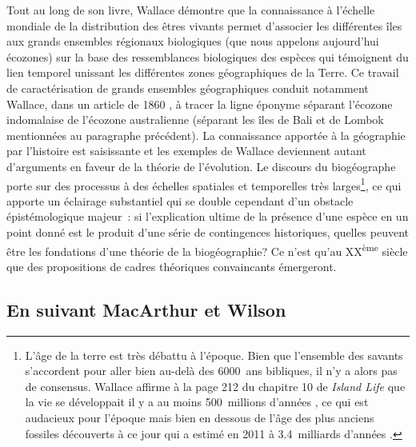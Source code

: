 Tout au long de son livre, Wallace démontre que la connaissance à
l'échelle mondiale de la distribution des êtres vivants permet
d'associer les différentes îles aux grands ensembles régionaux
biologiques (que nous appelons aujourd'hui écozones) sur la base des
ressemblances biologiques des espèces qui témoignent du lien temporel
unissant les différentes zones géographiques de la Terre. Ce travail de
caractérisation de grands ensembles géographiques conduit notamment
Wallace, dans un article de 1860 \citep{Wallace1860}, à tracer la ligne
éponyme séparant l'écozone indomalaise de l'écozone australienne
(séparant les îles de Bali et de Lombok mentionnées au paragraphe
précédent). La connaissance apportée à la géographie par l'histoire est
saisissante et les exemples de Wallace deviennent autant d'arguments en
faveur de la théorie de l'évolution. Le discours du biogéographe porte
sur des processus à des échelles spatiales et temporelles très
larges\footnote{L'âge de la terre est très débattu à l'époque. Bien que
  l'ensemble des savants s'accordent pour aller bien au-delà des
  6000~ans bibliques, il n'y a alors pas de consensus. Wallace affirme à
  la page 212 du chapitre 10 de \emph{Island Life} que la vie se
  développait il y a au moins 500~millions d'années
  \citep{wallace1881island}, ce qui est audacieux pour l'époque mais
  bien en dessous de l'âge des plus anciens fossiles découverts à ce
  jour qui a estimé en 2011 à 3.4~milliards d'années \citep{Wacey2011}.},
ce qui apporte un éclairage substantiel qui se double cependant d'un
obstacle épistémologique majeur~: si l'explication ultime de la présence
d'une espèce en un point donné est le produit d'une série de
contingences historiques, quelles peuvent être les fondations d'une
théorie de la biogéographie? Ce n'est qu'au XX\textsuperscript{ème}
siècle que des propositions de cadres théoriques convaincants
émergeront.

\subsection*{En suivant MacArthur et
Wilson}\label{en-suivant-macarthur-et-wilson}

